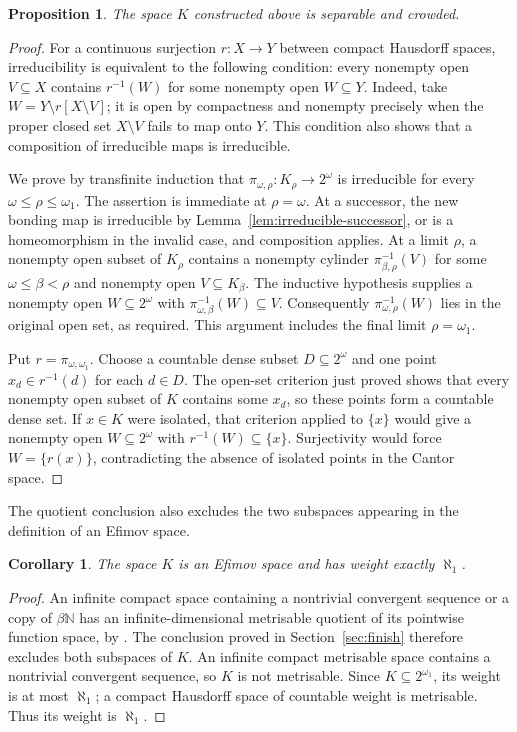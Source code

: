 \documentclass[a4paper,11pt]{amsart}
\theoremstyle{plain}
\newtheorem{proposition}[theorem]{Proposition}
\newtheorem{corollary}[theorem]{Corollary}
\theoremstyle{definition}
\theoremstyle{remark}
\newcommand{\N}{\mathbb N}
\numberwithin{equation}{section}
\begin{document}
\begin{proposition}\label{prop:separable-crowded}
The space $K$ constructed above is separable and crowded.
\end{proposition}
\begin{proof}
For a continuous surjection $r:X\to Y$ between compact Hausdorff spaces, irreducibility is equivalent to the following condition: every nonempty open $V\subseteq X$ contains $r^{-1}(W)$ for some nonempty open $W\subseteq Y$. Indeed, take $W=Y\setminus r[X\setminus V]$; it is open by compactness and nonempty precisely when the proper closed set $X\setminus V$ fails to map onto $Y$. This condition also shows that a composition of irreducible maps is irreducible.

We prove by transfinite induction that $\pi_{\omega,\rho}:K_\rho\to2^\omega$ is irreducible for every $\omega\leqslant\rho\leqslant\omega_1$. The assertion is immediate at $\rho=\omega$. At a successor, the new bonding map is irreducible by Lemma~\ref{lem:irreducible-successor}, or is a homeomorphism in the invalid case, and composition applies. At a limit $\rho$, a nonempty open subset of $K_\rho$ contains a nonempty cylinder $\pi_{\beta,\rho}^{-1}(V)$ for some $\omega\leqslant\beta<\rho$ and nonempty open $V\subseteq K_\beta$. The inductive hypothesis supplies a nonempty open $W\subseteq2^\omega$ with $\pi_{\omega,\beta}^{-1}(W)\subseteq V$. Consequently $\pi_{\omega,\rho}^{-1}(W)$ lies in the original open set, as required. This argument includes the final limit $\rho=\omega_1$.

Put $r=\pi_{\omega,\omega_1}$. Choose a countable dense subset $D\subseteq2^\omega$ and one point $x_d\in r^{-1}(d)$ for each $d\in D$. The open-set criterion just proved shows that every nonempty open subset of $K$ contains some $x_d$, so these points form a countable dense set. If $x\in K$ were isolated, that criterion applied to $\{x\}$ would give a nonempty open $W\subseteq2^\omega$ with $r^{-1}(W)\subseteq\{x\}$. Surjectivity would force $W=\{r(x)\}$, contradicting the absence of isolated points in the Cantor space.
\end{proof}

The quotient conclusion also excludes the two subspaces appearing in the definition of an Efimov space.

\begin{corollary}\label{cor:efimov}
The space $K$ is an Efimov space and has weight exactly $\aleph_1$.
\end{corollary}
\begin{proof}
An infinite compact space containing a nontrivial convergent sequence or a copy of $\beta\N$ has an infinite-dimensional metrisable quotient of its pointwise function space, by \cite[Corollary~3]{BKS2018}. The conclusion proved in Section~\ref{sec:finish} therefore excludes both subspaces of $K$. An infinite compact metrisable space contains a nontrivial convergent sequence, so $K$ is not metrisable. Since $K\subseteq2^{\omega_1}$, its weight is at most $\aleph_1$; a compact Hausdorff space of countable weight is metrisable. Thus its weight is $\aleph_1$.
\end{proof}
\end{document}
